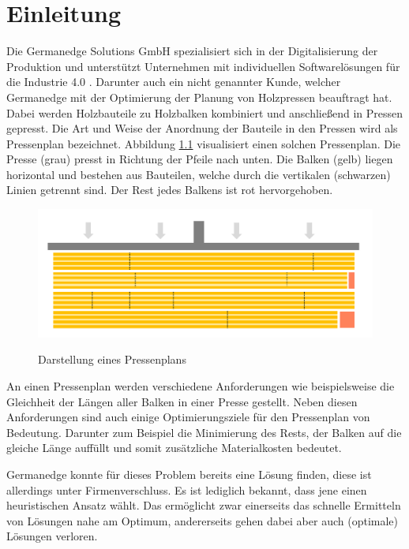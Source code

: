 \chapter{Einleitung}
\label{chapter:Einleitung}

Die Germanedge Solutions GmbH spezialisiert sich in der Digitalisierung der Produktion und
unterstützt Unternehmen mit individuellen Softwarelösungen für die Industrie 4.0 \cite{industry4dot0}.
Darunter auch ein nicht genannter Kunde, welcher Germanedge mit der Optimierung der Planung von Holzpressen beauftragt hat.
Dabei werden Holzbauteile zu Holzbalken kombiniert und anschließend in Pressen gepresst.
Die Art und Weise der Anordnung der Bauteile in den Pressen wird als Pressenplan bezeichnet.
Abbildung \ref{figure:pressenplan} visualisiert einen solchen Pressenplan.
Die Presse (grau) presst in Richtung der Pfeile nach unten.
Die Balken (gelb) liegen horizontal und bestehen aus Bauteilen, welche durch die vertikalen (schwarzen) Linien getrennt sind.
Der Rest jedes Balkens ist rot hervorgehoben.

\begin{figure}[h]
    \centering
    \includegraphics[width=1.00\textwidth, center]{Images/Pressenplan}\\
    \caption{Darstellung eines Pressenplans}
    \label{figure:pressenplan}
\end{figure}

An einen Pressenplan werden verschiedene Anforderungen wie beispielsweise die Gleichheit der Längen aller Balken in einer Presse gestellt.
Neben diesen Anforderungen sind auch einige Optimierungsziele für den Pressenplan von Bedeutung.
Darunter zum Beispiel die Minimierung des Rests, der Balken auf die gleiche Länge auffüllt und somit zusätzliche Materialkosten bedeutet.

Germanedge konnte für dieses Problem bereits eine Lösung finden, diese ist allerdings unter Firmenverschluss.
Es ist lediglich bekannt, dass jene einen heuristischen Ansatz wählt.
Das ermöglicht zwar einerseits das schnelle Ermitteln von Lösungen nahe am Optimum, andererseits gehen dabei aber auch (optimale) Lösungen verloren.

